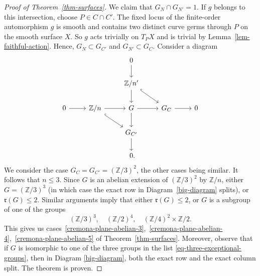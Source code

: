 \documentclass[11pt]{amsart}
\numberwithin{equation}{section}
\theoremstyle{definition}
\theoremstyle{remark}
\begin{document}
\begin{proof}[Proof of Theorem~\ref{thm-surfaces}]
We claim that $G_N\cap G_{N'}=1$. If $g$ belongs to this intersection, choose $P\in C\cap C'$. The fixed locus of the finite-order automorphism $g$ is smooth and contains two distinct curve germs through $P$ on the smooth surface $X$. So $g$ acts trivially on $T_PX$ and is trivial by Lemma~\ref{lem-faithful-action}.
Hence, $G_N\subset G_{C'}$ and $G_{N'}\subset G_{C}$. Consider a diagram
\begin{equation}
\label{big-diagram}
\begin{tikzcd}
& & 0 \ar[d]  & & \ \\
& & \mathbb{Z}/n' \ar[d] \ar[dr, hook] & & \ \\
0 \ar[r] & \mathbb{Z}/n \ar[r] \ar[dr, hook] & G \ar[r] \ar[d] & G_C \ar[r] & 0\\
& & G_{C'} \ar[d] & & \ \\
& & 0\rlap{.} & & \ 
\end{tikzcd}
\end{equation}
We consider the case $G_C=G_{C'}=(\mathbb{Z}/3)^2$, the other cases being similar. It follows that $n\leq 3$. Since $G$ is an abelian extension of $(\mathbb{Z}/3)^2$ by $\mathbb{Z}/n$, either $G=(\mathbb{Z}/3)^3$ (in which case the exact row in Diagram~\eqref{big-diagram} splits), or $\mathfrak{r}(G)\leq 2$. Similar arguments imply that either $\mathfrak{r}(G)\leq 2$, or $G$ is a subgroup of one of the groups 
\begin{equation}
\label{eq-three-exceptional-groups}
(\mathbb{Z}/3)^3, \quad  (\mathbb{Z}/2)^4,  \quad (\mathbb{Z}/4)^2\times \mathbb{Z}/2.
\end{equation}
This gives us cases~\eqref{cremona-plane-abelian-3},~\eqref{cremona-plane-abelian-4},~\eqref{cremona-plane-abelian-5} of Theorem~\ref{thm-surfaces}. 
Moreover, observe that if $G$ is isomorphic to one of the three groups in the list \eqref{eq-three-exceptional-groups}, then in Diagram \eqref{big-diagram},  both the exact row and the exact column split. 
The theorem is proven.
\end{proof}
\end{document}
